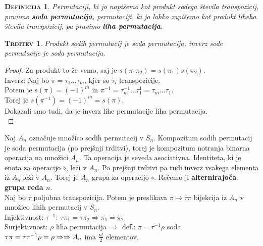 \documentclass[a4paper,12pt]{article}
\newtheorem*{trditev}{\textsc{Trditev}}
\newtheorem*{definicija}{\textsc{Definicija}}
\begin{document}
\begin{definicija}
Permutaciji, ki jo napišemo kot produkt sodega števila transpozicij, pravimo \textbf{soda permutacija}, permutaciji, ki jo lahko zapišemo kot produkt liheha števila transpozicij, pa pravimo \textbf{liha permutacija}. \\
\end{definicija}

\begin{trditev}
Produkt sodih permutacij je soda permutacija, inverz sode permutacije je soda permutacija.\\
\end{trditev}

\begin{proof}
Za produkt to že vemo, saj je $s(\pi_1\pi_2)=s(\pi_1)s(\pi_2)$. \\

\noindent Inverz: Naj bo $\pi=\tau_1\ldots \tau_m$, kjer so $\tau_i$ transpozicije. \\

Potem je $s(\pi)=(-1)^m$ in $\pi^{-1}=\tau_m^{-1}\ldots\tau_1^1=\tau_m\ldots \tau_1$. \\

Torej je $s(\pi^{-1})=(-1)^m=s(\pi)$. \\

\noindent Dokazali smo tudi, da je inverz lihe permutacije liha permutacija.\\
\end{proof}


\noindent Naj $A_n$ označuje množico sodih permutacij v $S_n$. Kompozitum sodih permutacij je soda permutacija (po prejšnji trditvi), torej je kompozitum notranja binarna operacija na množici $A_n$. Ta operacija je seveda asociativna. Identiteta, ki je enota za operacijo $\circ$, leži v $A_n$. Po prejšnji trditvi pa tudi inverz vsakega elementa iz $A_n$ leži v $A_n$. Torej je $A_n$ grupa za operacijo $\circ$. Rečemo ji \textbf{alternirajoča grupa reda $n$}. \\

\noindent Naj bo $\tau$ poljubna transpozicija. Potem je preslikava $\pi\mapsto \tau\pi$ bijekcija iz $A_n$ v množico lihih permutacij v $S_n$. \\

\noindent Injektivnost: $\tau^{-1}:~\tau\pi_1=\tau\pi_2 \Rightarrow \pi_1=\pi_2$ \\

\noindent Surjektivnost: $\rho$ liha permutacija $\Rightarrow$ def.: $\pi=\tau^{-1}\rho$ soda $\tau\pi=\tau\tau^{-1}\rho=\rho \Rightarrow \linebreak \Rightarrow A_n$ ima $\frac{n!}{2}$ elementov.
\end{document}
